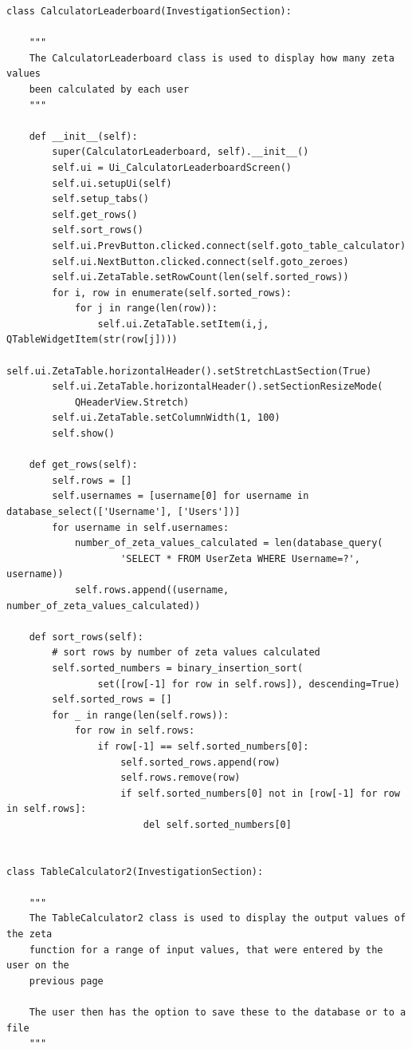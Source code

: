 \documentclass{article}
\begin{document}
\begin{lstlisting}
class CalculatorLeaderboard(InvestigationSection):

    """
    The CalculatorLeaderboard class is used to display how many zeta values
    been calculated by each user
    """

    def __init__(self):
        super(CalculatorLeaderboard, self).__init__()
        self.ui = Ui_CalculatorLeaderboardScreen()
        self.ui.setupUi(self)
        self.setup_tabs()
        self.get_rows()
        self.sort_rows()
        self.ui.PrevButton.clicked.connect(self.goto_table_calculator)
        self.ui.NextButton.clicked.connect(self.goto_zeroes)
        self.ui.ZetaTable.setRowCount(len(self.sorted_rows))
        for i, row in enumerate(self.sorted_rows):
            for j in range(len(row)):
                self.ui.ZetaTable.setItem(i,j, QTableWidgetItem(str(row[j])))
        self.ui.ZetaTable.horizontalHeader().setStretchLastSection(True)
        self.ui.ZetaTable.horizontalHeader().setSectionResizeMode(
            QHeaderView.Stretch)
        self.ui.ZetaTable.setColumnWidth(1, 100)
        self.show()

    def get_rows(self):
        self.rows = []
        self.usernames = [username[0] for username in database_select(['Username'], ['Users'])]
        for username in self.usernames:
            number_of_zeta_values_calculated = len(database_query(
                    'SELECT * FROM UserZeta WHERE Username=?', username))
            self.rows.append((username, number_of_zeta_values_calculated))

    def sort_rows(self):
        # sort rows by number of zeta values calculated
        self.sorted_numbers = binary_insertion_sort(
                set([row[-1] for row in self.rows]), descending=True)
        self.sorted_rows = []
        for _ in range(len(self.rows)):
            for row in self.rows:
                if row[-1] == self.sorted_numbers[0]:
                    self.sorted_rows.append(row)
                    self.rows.remove(row)
                    if self.sorted_numbers[0] not in [row[-1] for row in self.rows]:
                        del self.sorted_numbers[0]


class TableCalculator2(InvestigationSection):

    """
    The TableCalculator2 class is used to display the output values of the zeta
    function for a range of input values, that were entered by the user on the
    previous page

    The user then has the option to save these to the database or to a file
    """


\end{lstlisting}
\end{document}
